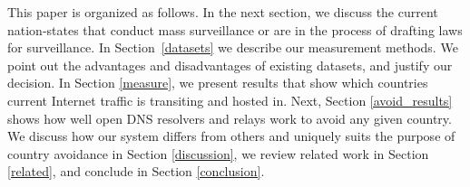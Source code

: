 This paper is organized as follows.  In the next section, we discuss
the current nation-states that conduct mass surveillance or are in the 
process of drafting laws for surveillance.  In
Section~\ref{datasets} we describe our measurement methods.
We point out the advantages and disadvantages of existing datasets, and
justify our decision.  In Section \ref{measure}, we present results that show which countries
current Internet traffic is transiting and hosted in.  Next, Section
\ref{avoid_results} shows how well open DNS resolvers and relays work to avoid any
given country.  We discuss how our system differs from others and
uniquely suits the purpose of country avoidance in Section
\ref{discussion}, we review related work in Section \ref{related}, and
conclude in Section \ref{conclusion}. 
